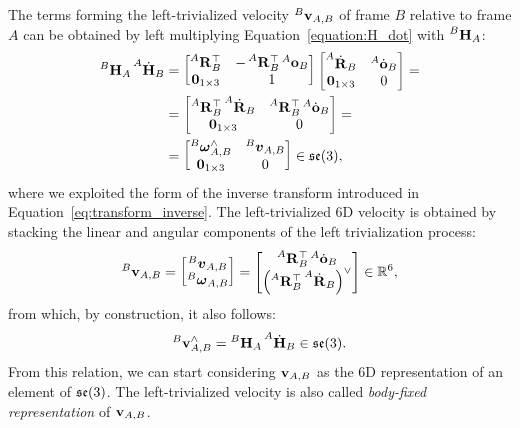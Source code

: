 The terms forming the left-trivialized velocity $\velsix[B]_{A,B}$ of frame $B$ relative to frame $A$ can be obtained by left multiplying Equation~\eqref{equation:H_dot} with $\homo[B]_A$:
%
\begin{align*}
    \homo[B]_A \homod[A]_B
    &= \begin{bmatrix}
        \rot[A]_B^\top & -\rot[A]_B^\top \ori[A]_B \\
        \zeros_{1\times3} & 1
    \end{bmatrix}
    \begin{bmatrix}
        \rotd[A]_B & \orid[A]_B \\ \zeros_{1\times 3} & 0
    \end{bmatrix} =\\
    &= \begin{bmatrix}
        \rot[A]_B^\top \rotd[A]_B & \rot[A]_B^\top \orid[A]_B \\
        \zeros_{1\times 3} & 0
    \end{bmatrix} =\\
    &=
    \begin{bmatrix}
        \velang[B]_{A,B}^\wedge& \vellin[B]_{A,B} \\
        \zeros_{1\times 3} & 0
    \end{bmatrix}
    \in \se(3)
    ,
\end{align*}
%
where we exploited the form of the inverse transform introduced in Equation~\eqref{eq:transform_inverse}.
%
The left-trivialized 6D velocity is obtained by stacking the linear and angular components of the left trivialization process:
%
\begin{equation*}
    \velsix[B]_{A,B} =
    \begin{bmatrix}
        \vellin[B]_{A,B} \\ \velang[B]_{A,B}
    \end{bmatrix} =
    \begin{bmatrix}
        \rot[A]_B^\top \orid[A]_B \\
        \left( \rot[A]_B^\top \rotd[A]_B \right)^\vee
    \end{bmatrix}
    \in \realn^6
    ,
\end{equation*}
%
from which, by construction, it also follows:
%
\begin{equation}
    \label{eq:sixd_velocity_body_fixed}
    \velsix[B]_{A,B}^\wedge = \homo[B]_A \homod[A]_B \in \se(3)
    .
\end{equation}
%
From this relation, we can start considering $\velsix_{A,B}$ as the 6D representation of an element of $\se(3)$.
The left-trivialized velocity is also called \emph{body-fixed representation} of $\velsix_{A,B}$.

